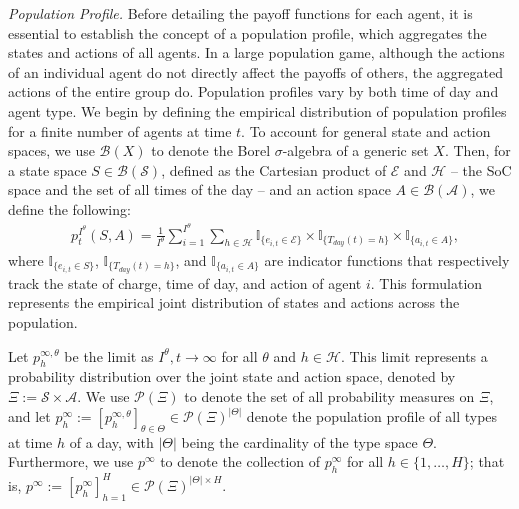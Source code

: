 \documentclass{article}
\theoremstyle{definition}
\theoremstyle{plain}
\begin{document}
\textit{Population Profile.} Before detailing the payoff functions for each agent, it is essential to establish the concept of a population profile, which aggregates the states and actions of all agents. In a large population game, although the actions of an individual agent do not directly affect the payoffs of others, the aggregated actions of the entire group do. 
Population profiles vary by both time of day and agent type. We begin by defining the empirical distribution of population profiles for a finite number of agents at time  $t$. To account for general state and action spaces, we use $\mathcal{B}(X)$ to denote the Borel $\sigma$-algebra of a generic set $X$. Then, for a state space \( S \in \mathcal{B}(\mathcal{S}) \), defined as the Cartesian product of \( \mathcal{E} \) and \( \mathcal{H} \) -- the SoC space and the set of all times of the day -- and an action space \( A \in \mathcal{B}(\mathcal{A}) \), 
we define the following:
\begin{align}\label{eq:EmpiricalPopProfile}
& p^{I^{\theta}}_{t}(S,A) = \frac{1}{I^{\theta}}\sum_{i=1}^{I^{\theta}} \sum_{h\in\mathcal{H}}\mathbb{I}_{\{e_{i,t}\in \mathcal{E}\}}\times \mathbb{I}_{\{T_{day}(t)=h\}}\times \mathbb{I}_{\{a_{i,t} \in A\}},
\end{align}
where $\mathbb{I}_{\{e_{i,t}\in S\}}$, $\mathbb{I}_{\{T_{day}(t)=h\}}$, and $\mathbb{I}_{\{a_{i,t} \in A\}}$ are indicator functions that respectively track the state of charge, time of day, and action of agent $i$. This formulation represents the empirical joint distribution of states and actions across the population. 

Let $p^{\infty,\theta}_{h}$ be the limit as $I^{\theta}, t \rightarrow \infty$ for all $\theta$ and $h \in \mathcal{H}$. This limit represents a probability distribution over the joint state and action space, denoted by $\Xi := \mathcal{S} \times \mathcal{A}$. We use $\mathcal{P}(\Xi)$ to denote the set of all probability measures on $\Xi$, and let $p^{\infty}_{h} := [p^{\infty,\theta}_{h}]_{\theta \in \Theta} \in \mathcal{P}(\Xi)^{|\Theta|}$ denote the population profile of all types at time $h$ of a day, with $|\Theta|$ being the cardinality of the type space $\Theta$. Furthermore, we use $p^{\infty}$ to denote the collection of $p^{\infty}_{h}$ for all $h \in \{1, \ldots, H\}$; that is, $p^{\infty} := [p^{\infty}_{h}]_{h=1}^{H} \in \mathcal{P}(\Xi)^{|\Theta|\times H}$. 
\end{document}
